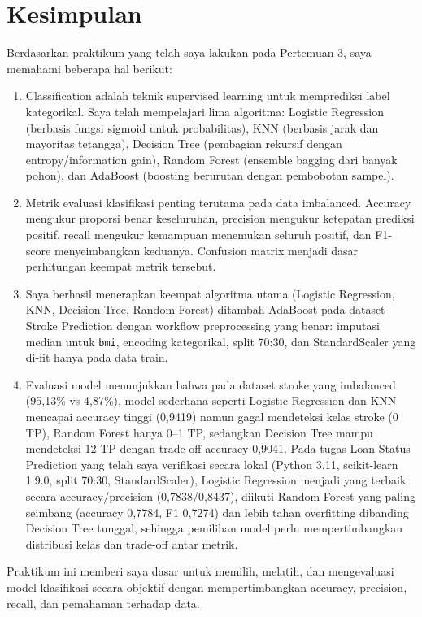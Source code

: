 \documentclass[a4paper,oneside,12pt]{report}
\begin{document}
\chapter{Kesimpulan}
Berdasarkan praktikum yang telah saya lakukan pada Pertemuan 3, saya memahami beberapa hal berikut:
\begin{enumerate}
    \item Classification adalah teknik supervised learning untuk memprediksi label kategorikal. Saya telah mempelajari lima algoritma: Logistic Regression (berbasis fungsi sigmoid untuk probabilitas), KNN (berbasis jarak dan mayoritas tetangga), Decision Tree (pembagian rekursif dengan entropy/information gain), Random Forest (ensemble bagging dari banyak pohon), dan AdaBoost (boosting berurutan dengan pembobotan sampel).
    \item Metrik evaluasi klasifikasi penting terutama pada data imbalanced. Accuracy mengukur proporsi benar keseluruhan, precision mengukur ketepatan prediksi positif, recall mengukur kemampuan menemukan seluruh positif, dan F1-score menyeimbangkan keduanya. Confusion matrix menjadi dasar perhitungan keempat metrik tersebut.
    \item Saya berhasil menerapkan keempat algoritma utama (Logistic Regression, KNN, Decision Tree, Random Forest) ditambah AdaBoost pada dataset Stroke Prediction dengan workflow preprocessing yang benar: imputasi median untuk \texttt{bmi}, encoding kategorikal, split 70:30, dan StandardScaler yang di-fit hanya pada data train.
    \item Evaluasi model menunjukkan bahwa pada dataset stroke yang imbalanced (95,13\% vs 4,87\%), model sederhana seperti Logistic Regression dan KNN mencapai accuracy tinggi (0,9419) namun gagal mendeteksi kelas stroke (0 TP), Random Forest hanya 0--1 TP, sedangkan Decision Tree mampu mendeteksi 12 TP dengan trade-off accuracy 0,9041. Pada tugas Loan Status Prediction yang telah saya verifikasi secara lokal (Python 3.11, scikit-learn 1.9.0, split 70:30, StandardScaler), Logistic Regression menjadi yang terbaik secara accuracy/precision (0,7838/0,8437), diikuti Random Forest yang paling seimbang (accuracy 0,7784, F1 0,7274) dan lebih tahan overfitting dibanding Decision Tree tunggal, sehingga pemilihan model perlu mempertimbangkan distribusi kelas dan trade-off antar metrik.
\end{enumerate}
Praktikum ini memberi saya dasar untuk memilih, melatih, dan mengevaluasi model klasifikasi secara objektif dengan mempertimbangkan accuracy, precision, recall, dan pemahaman terhadap data.
\end{document}

